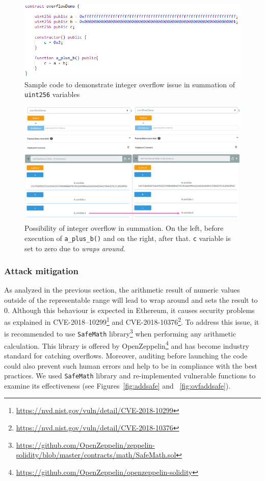 \begin{figure}[t]
	\centering
	\includegraphics[width=0.9\linewidth]{figures/img08.png}
	\caption{Sample code to demonstrate integer overflow issue in summation of \texttt{uint256} variables}
	\label{fig:ovfsum}
\end{figure}

\begin{figure}[t]
	\centering
	\includegraphics[width=1.0\linewidth]{figures/img09.png}
	\caption{Possibility of integer overflow in summation. On the left, before execution of \texttt{a\_plus\_b()} and on the right, after that. \texttt{c} variable is set to zero due to \textit{wraps around}.}
	\label{fig:ovftran2}
\end{figure}

\subsubsection{Attack mitigation}
As analyzed in the previous section, the arithmetic result of numeric values outside of the representable range will lead to wrap around and sets the result to 0. Although this behaviour is expected in Ethereum, it causes security problems as explained in CVE-2018–10299\footnote{\url{https://nvd.nist.gov/vuln/detail/CVE-2018-10299}} and CVE-2018-10376\footnote{\url{https://nvd.nist.gov/vuln/detail/CVE-2018-10376}}. To address this issue, it is recommended to use \texttt{SafeMath} library\footnote{\url{https://github.com/OpenZeppelin/zeppelin-solidity/blob/master/contracts/math/SafeMath.sol}} when performing any arithmetic calculation. This library is offered by OpenZeppelin\footnote{\url{https://github.com/OpenZeppelin/openzeppelin-solidity}} and has become industry standard for catching overflows. Moreover, auditing before launching the code could also prevent such human errors and help to be in compliance with the best practices. We used \texttt{SafeMath} library and re-implemented vulnerable functions to examine its effectiveness (see Figures~\ref{fig:addsafe} and ~\ref{fig:ovfaddsafe}).

